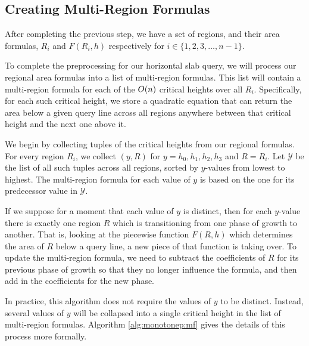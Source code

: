 \subsection{Creating Multi-Region Formulas}
\label{sec:mr_formula}

After completing the previous step, we have a set of regions, and their area formulas, $R_i$ and $F(R_i, h)$ respectively for $i \in \{1, 2, 3, \ldots, n-1\}$.

To complete the preprocessing for our horizontal slab query, we will process our regional area formulas into a list of multi-region formulas. This list will contain a multi-region formula for each of the $O\!\left(n\right)$ critical heights over all $R_i$. Specifically, for each such critical height, we store a quadratic equation that can return the area below a given query line across all regions anywhere between that critical height and the next one above it.

We begin by collecting tuples of the critical heights from our regional formulas. For every region $R_i$, we collect $(y, R)$ for $y = h_0, h_1, h_2, h_3$ and $R = R_i$. Let $\mathcal{Y}$ be the list of all such tuples across all regions, sorted by $y$-values from lowest to highest. The multi-region formula for each value of $y$ is based on the one for its predecessor value in $\mathcal{Y}$.

If we suppose for a moment that each value of $y$ is distinct, then for each $y$-value there is exactly one region $R$ which is transitioning from one phase of growth to another. That is, looking at the piecewise function $F(R, h)$ which determines the area of $R$ below a query line, a new piece of that function is taking over. To update the multi-region formula, we need to subtract the coefficients of $R$ for its previous phase of growth so that they no longer influence the formula, and then add in the coefficients for the new phase.

In practice, this algorithm does not require the values of $y$ to be distinct. Instead, several values of $y$ will be collapsed into a single critical height in the list of multi-region formulas. Algorithm \ref{alg:monotonep:mf} gives the details of this process more formally.

